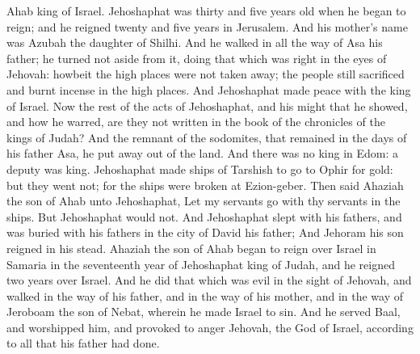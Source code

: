 Ahab king of Israel. Jehoshaphat was thirty and five years old when he began to reign; and he reigned twenty and five years in Jerusalem. And his mother’s name was Azubah the daughter of Shilhi. And he walked in all the way of Asa his father; he turned not aside from it, doing that which was right in the eyes of Jehovah: howbeit the high places were not taken away; the people still sacrificed and burnt incense in the high places. And Jehoshaphat made peace with the king of Israel.  Now the rest of the acts of Jehoshaphat, and his might that he showed, and how he warred, are they not written in the book of the chronicles of the kings of Judah? And the remnant of the sodomites, that remained in the days of his father Asa, he put away out of the land. And there was no king in Edom: a deputy was king. Jehoshaphat made ships of Tarshish to go to Ophir for gold: but they went not; for the ships were broken at Ezion-geber. Then said Ahaziah the son of Ahab unto Jehoshaphat, Let my servants go with thy servants in the ships. But Jehoshaphat would not. And Jehoshaphat slept with his fathers, and was buried with his fathers in the city of David his father; And Jehoram his son reigned in his stead.  Ahaziah the son of Ahab began to reign over Israel in Samaria in the seventeenth year of Jehoshaphat king of Judah, and he reigned two years over Israel. And he did that which was evil in the sight of Jehovah, and walked in the way of his father, and in the way of his mother, and in the way of Jeroboam the son of Nebat, wherein he made Israel to sin. And he served Baal, and worshipped him, and provoked to anger Jehovah, the God of Israel, according to all that his father had done. 